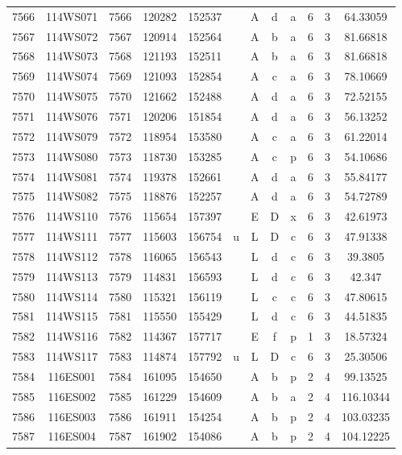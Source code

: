 \begin{tabular}{|*{12}{c|}}
7566 & 114WS071 & 7566 & 120282 & 152537 &  & A & d & a & 6 & 3 & 64.33059 \\ 
7567 & 114WS072 & 7567 & 120914 & 152564 &  & A & b & a & 6 & 3 & 81.66818 \\ 
7568 & 114WS073 & 7568 & 121193 & 152511 &  & A & b & a & 6 & 3 & 81.66818 \\ 
7569 & 114WS074 & 7569 & 121093 & 152854 &  & A & c & a & 6 & 3 & 78.10669 \\ 
7570 & 114WS075 & 7570 & 121662 & 152488 &  & A & d & a & 6 & 3 & 72.52155 \\ 
7571 & 114WS076 & 7571 & 120206 & 151854 &  & A & d & a & 6 & 3 & 56.13252 \\ 
7572 & 114WS079 & 7572 & 118954 & 153580 &  & A & c & a & 6 & 3 & 61.22014 \\ 
7573 & 114WS080 & 7573 & 118730 & 153285 &  & A & c & p & 6 & 3 & 54.10686 \\ 
7574 & 114WS081 & 7574 & 119378 & 152661 &  & A & d & a & 6 & 3 & 55.84177 \\ 
7575 & 114WS082 & 7575 & 118876 & 152257 &  & A & d & a & 6 & 3 & 54.72789 \\ 
7576 & 114WS110 & 7576 & 115654 & 157397 &  & E & D & x & 6 & 3 & 42.61973 \\ 
7577 & 114WS111 & 7577 & 115603 & 156754 & u & L & D & c & 6 & 3 & 47.91338 \\ 
7578 & 114WS112 & 7578 & 116065 & 156543 &  & L & d & c & 6 & 3 & 39.3805 \\ 
7579 & 114WS113 & 7579 & 114831 & 156593 &  & L & d & c & 6 & 3 & 42.347 \\ 
7580 & 114WS114 & 7580 & 115321 & 156119 &  & L & c & c & 6 & 3 & 47.80615 \\ 
7581 & 114WS115 & 7581 & 115550 & 155429 &  & L & d & c & 6 & 3 & 44.51835 \\ 
7582 & 114WS116 & 7582 & 114367 & 157717 &  & E & f & p & 1 & 3 & 18.57324 \\ 
7583 & 114WS117 & 7583 & 114874 & 157792 & u & L & D & c & 6 & 3 & 25.30506 \\ 
7584 & 116ES001 & 7584 & 161095 & 154650 &  & A & b & p & 2 & 4 & 99.13525 \\ 
7585 & 116ES002 & 7585 & 161229 & 154609 &  & A & b & a & 2 & 4 & 116.10344 \\ 
7586 & 116ES003 & 7586 & 161911 & 154254 &  & A & b & p & 2 & 4 & 103.03235 \\ 
7587 & 116ES004 & 7587 & 161902 & 154086 &  & A & b & p & 2 & 4 & 104.12225 \\ 

\end{tabular}
